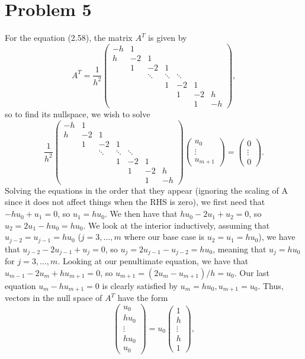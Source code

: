 \documentclass{article}
\begin{document}
\section{Problem 5}
For the equation (2.58), the matrix $A^T$ is given by
\[
A^T = \frac{1}{h^2}\begin{pmatrix}
-h & 1 \\
h & -2 & 1 \\
& 1 & -2 & 1 \\
&& \ddots & \ddots & \ddots \\
&&&1&-2&1\\
&&&& 1 & -2 & h \\
&&&&& 1 & -h
\end{pmatrix},
\]
so to find its nullspace, we wish to solve
\[
\frac{1}{h^2}\begin{pmatrix}
-h & 1 \\
h & -2 & 1 \\
& 1 & -2 & 1 \\
&& \ddots & \ddots & \ddots \\
&&&1&-2&1\\
&&&& 1 & -2 & h \\
&&&&& 1 & -h
\end{pmatrix}\begin{pmatrix}
u_0\\ \vdots \\ u_{m+1}
\end{pmatrix}=\begin{pmatrix}
0\\ \vdots \\0
\end{pmatrix}.
\]
Solving the equations in the order that they appear (ignoring the scaling of A since it does not affect things when the RHS is zero), we first need that $-hu_0+u_1=0$, so $u_1=hu_0$. We then have that $hu_0-2u_1+u_2=0$, so $u_2=2u_1-hu_0=hu_0$. We look at the interior inductively, assuming that $u_{j-2}=u_{j-1}=hu_0$ ($j=3,\ldots,m$ where our base case is $u_2=u_1=hu_0$), we have that $u_{j-2}-2u_{j-1}+u_j=0$, so $u_j=2u_{j-1}-u_{j-2}=hu_0$, meaning that $u_j=hu_0$ for $j=3,\ldots,m$. Looking at our penultimate equation, we have that $u_{m-1}-2u_m+hu_{m+1}=0$, so $u_{m+1}=(2u_m-u_{m+1})/h=u_0$. Our last equation $u_m-hu_{m+1}=0$ is clearly satisfied by $u_m=hu_0,u_{m+1}=u_0$. Thus, vectors in the null space of $A^T$ have the form
\[
\begin{pmatrix}
u_0\\hu_0\\ \vdots \\ hu_0\\ u_0
\end{pmatrix}=u_0\begin{pmatrix}
1\\h\\ \vdots \\ h\\ 1
\end{pmatrix},
\]
\end{document}
